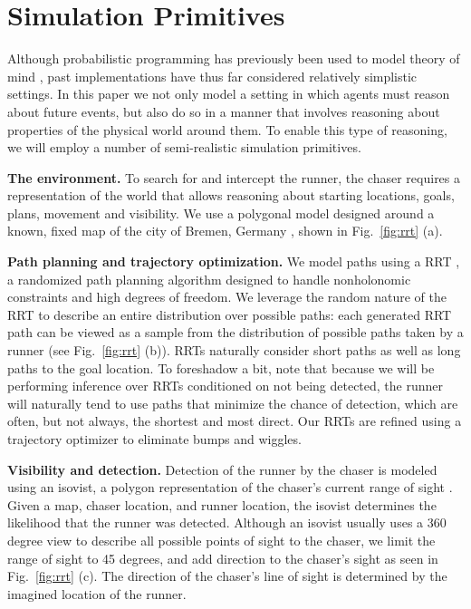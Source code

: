 \documentclass[twoside]{article}
\begin{document}
\section{Simulation Primitives}

Although probabilistic programming has previously been used to model theory of mind \cite{baker2009action, stuhlmuller2014reasoning}, past implementations have thus far considered relatively simplistic settings. In this paper we not only model a setting in which agents must reason about future events, but also do so in a manner that involves reasoning about properties of the physical world around them. To enable this type of reasoning, we will employ a number of semi-realistic simulation primitives.

\textbf{The environment.}  To search for and intercept the runner, the
chaser requires a representation of the world that allows reasoning
about starting locations, goals, plans, movement and visibility. We
use a polygonal model designed around a known, fixed map of the city of
Bremen, Germany \cite{BremenPointCloud}, shown in Fig.~\ref{fig:rrt} (a).

\textbf{Path planning and trajectory optimization.}  We model paths
using a RRT
\cite{lavalle1998rapidly}, a randomized path planning algorithm
designed to handle nonholonomic constraints and high degrees of
freedom.  We leverage the random nature of the RRT to describe an
entire distribution over possible paths: each generated RRT path can
be viewed as a sample from the distribution of possible paths taken by
a runner (see Fig.~\ref{fig:rrt} (b)). RRTs naturally consider short
paths as well as long paths to the goal location. To foreshadow a bit,
note that because we will be performing inference over RRTs
conditioned on not being detected, the runner will naturally tend to
use paths that minimize the chance of detection, which are often, but
not always, the shortest and most direct.  Our RRTs are
refined using a trajectory optimizer to eliminate bumps
and wiggles.

\textbf{Visibility and detection.}  Detection of the runner by the
chaser is modeled using an isovist, a polygon
representation of the chaser's current range of sight
\cite{isovist79,morariu2007human}. Given a map, chaser location, and
runner location, the isovist determines the likelihood
that the runner was detected. Although an isovist usually uses a 360
degree view to describe all possible points of sight to the chaser, we
limit the range of sight to 45
degrees, and add direction to the chaser's sight as seen in
Fig.~\ref{fig:rrt} (c). The direction of the chaser's line of sight is determined by the imagined location of the runner.
\end{document}
